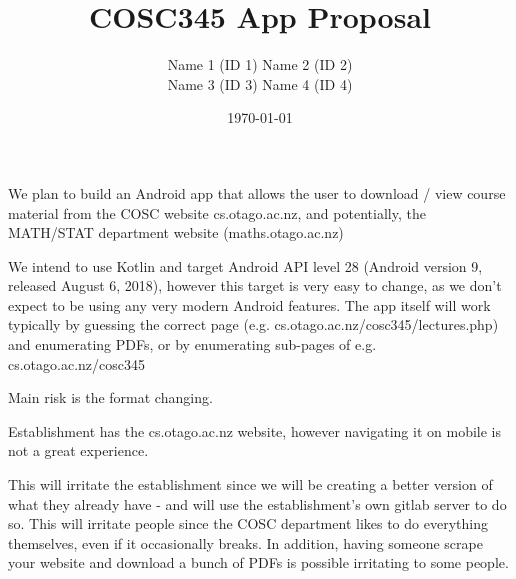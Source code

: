\documentclass{article}
\title{COSC345 App Proposal}
\author{Name 1 (ID 1) Name 2 (ID 2) \\ Name 3 (ID 3) Name 4 (ID 4)}
\date{\today}
\begin{document}
	\maketitle
	
	We plan to build an Android app that allows the user to download / view course material from the COSC website cs.otago.ac.nz, and potentially, the MATH/STAT department website (maths.otago.ac.nz)
	
	We intend to use Kotlin and target Android API level 28 (Android version 9, released August 6, 2018), however this target is very easy to change, as we don't expect to be using any very modern Android features. The app itself will work typically by guessing the correct page (e.g. cs.otago.ac.nz/cosc345/lectures.php) and enumerating PDFs, or by enumerating sub-pages of e.g. cs.otago.ac.nz/cosc345
	
	Main risk is the format changing.
	
	Establishment has the cs.otago.ac.nz website, however navigating it on mobile is not a great experience.
	
	This will irritate the establishment since we will be creating a better version of what they already have - and will use the establishment's own gitlab server to do so. This will irritate people since the COSC department likes to do everything themselves, even if it occasionally breaks. In addition, having someone scrape your website and download a bunch of PDFs is possible irritating to some people.
\end{document}

